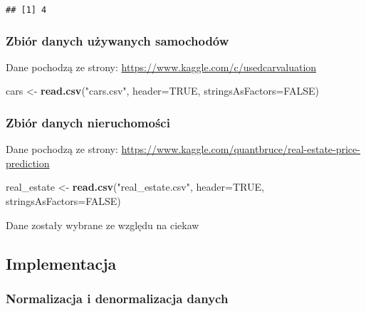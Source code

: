 \documentclass[
]{article}
\newenvironment{Shaded}{\begin{snugshade}}{\end{snugshade}}
\newcommand{\DataTypeTok}[1]{\textcolor[rgb]{0.13,0.29,0.53}{#1}}
\newcommand{\KeywordTok}[1]{\textcolor[rgb]{0.13,0.29,0.53}{\textbf{#1}}}
\newcommand{\NormalTok}[1]{#1}
\newcommand{\OtherTok}[1]{\textcolor[rgb]{0.56,0.35,0.01}{#1}}
\newcommand{\StringTok}[1]{\textcolor[rgb]{0.31,0.60,0.02}{#1}}
\begin{document}
\begin{verbatim}
## [1] 4
\end{verbatim}

\hypertarget{zbiuxf3r-danych-uux17cywanych-samochoduxf3w}{%
\subsubsection{Zbiór danych używanych
samochodów}\label{zbiuxf3r-danych-uux17cywanych-samochoduxf3w}}

Dane pochodzą ze strony:
\href{}{https://www.kaggle.com/c/usedcarvaluation}

\begin{Shaded}
\begin{Highlighting}[]
\NormalTok{cars <-}\StringTok{ }\KeywordTok{read.csv}\NormalTok{(}\StringTok{"cars.csv"}\NormalTok{, }\DataTypeTok{header=}\OtherTok{TRUE}\NormalTok{, }\DataTypeTok{stringsAsFactors=}\OtherTok{FALSE}\NormalTok{)}
\end{Highlighting}
\end{Shaded}

\hypertarget{zbiuxf3r-danych-nieruchomoux15bci}{%
\subsubsection{Zbiór danych
nieruchomości}\label{zbiuxf3r-danych-nieruchomoux15bci}}

Dane pochodzą ze strony:
\href{}{https://www.kaggle.com/quantbruce/real-estate-price-prediction}

\begin{Shaded}
\begin{Highlighting}[]
\NormalTok{real_estate <-}\StringTok{ }\KeywordTok{read.csv}\NormalTok{(}\StringTok{"real_estate.csv"}\NormalTok{, }\DataTypeTok{header=}\OtherTok{TRUE}\NormalTok{, }\DataTypeTok{stringsAsFactors=}\OtherTok{FALSE}\NormalTok{)}
\end{Highlighting}
\end{Shaded}

Dane zostały wybrane ze względu na ciekaw

\hypertarget{implementacja}{%
\subsection{Implementacja}\label{implementacja}}

\hypertarget{normalizacja-i-denormalizacja-danych}{%
\subsubsection{Normalizacja i denormalizacja
danych}\label{normalizacja-i-denormalizacja-danych}}
\end{document}
